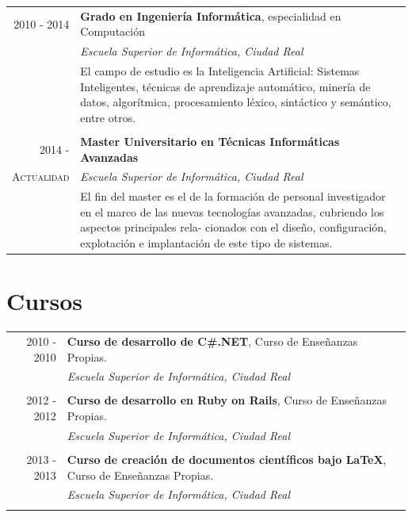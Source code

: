 \documentclass[runningheads,a4paper]{llncs}
\theoremstyle{break}
\begin{document}
\begin{tabular}{rp{11cm}}
 \textsc{2010 - 2014} & \textbf{Grado en Ingeniería Informática}, especialidad en Computación\\
  & \emph{Escuela Superior de Informática, Ciudad Real}\\
  & El campo de estudio es la Inteligencia Artificial: Sistemas Inteligentes, técnicas de aprendizaje automático, minería de datos, algorítmica, procesamiento léxico, sintáctico y semántico, entre otros.\\\\

 \textsc{2014 -} & \textbf{Master Universitario en Técnicas Informáticas 	Avanzadas}\\
  \textsc{Actualidad} & \emph{Escuela Superior de Informática, Ciudad Real}\\
  & El fin del master es el de la formación de personal investigador en el marco de las nuevas tecnologías avanzadas, cubriendo los aspectos principales rela- cionados con el diseño, configuración, explotación e implantación de este tipo de sistemas.\\
\end{tabular}

\section*{Cursos}
\textbf{}

\begin{tabular}{rp{11cm}}
 \textsc{2010 - 2010} & \textbf{Curso de desarrollo de C\#.NET}, Curso de Enseñanzas Propias.\\
  & \emph{Escuela Superior de Informática, Ciudad Real}\\\\

   \textsc{2012 - 2012} & \textbf{Curso de desarrollo en Ruby on Rails}, Curso de Enseñanzas Propias.\\
  & \emph{Escuela Superior de Informática, Ciudad Real}\\\\

   \textsc{2013 - 2013} & \textbf{Curso de creación de documentos científicos bajo LaTeX}, Curso de Enseñanzas Propias.\\
  & \emph{Escuela Superior de Informática, Ciudad Real}\\\\

\end{tabular}
\end{document}
